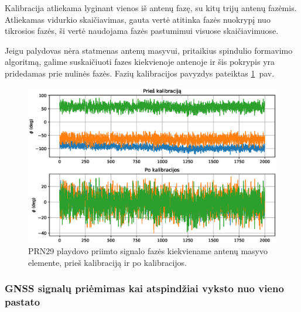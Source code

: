 \documentclass[main.tex]{subfiles}
\begin{document}
Kalibracija atliekama lyginant vienos iš antenų fazę, su kitų trijų antenų fazėmis.
Atliekamas vidurkio skaičiavimas, gauta vertė atitinka fazės nuokrypį nuo tikrosios
fazės, ši vertė naudojama fazės pastumimui visuose skaičiavimuose.

Jeigu palydovas nėra statmenas antenų masyvui, pritaikius spindulio formavimo
algoritmą, galime suskaičiuoti fazes kiekvienoje antenoje ir šis pokrypis
yra pridedamas prie nulinės fazės. Fazių kalibracijos pavyzdys pateiktas
\ref{fig:gnss_phase_calibration}~pav.

\begin{figure}[ht]
    \begin{centering}
    \includegraphics[scale=0.65]{drawings/phase_calibration}
    \par\end{centering}
    \protect\caption{\label{fig:gnss_phase_calibration}PRN29 playdovo priimto signalo fazės kiekviename antenų masyvo elemente, prieš kalibraciją ir po kalibracijos.}
\end{figure}


\subsubsection{GNSS signalų priėmimas kai atspindžiai vyksto nuo vieno pastato}
\end{document}
